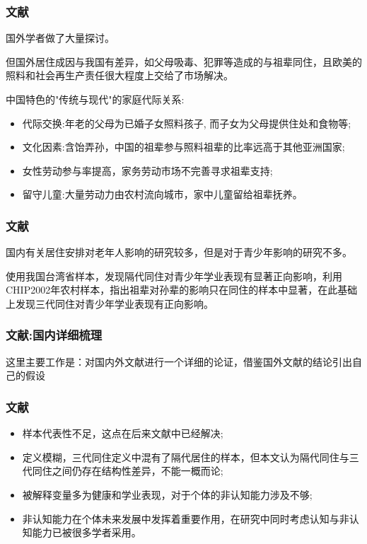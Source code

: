 \documentclass{beamer}
\begin{document}
\begin{frame}
\frametitle{文献} 
国外学者做了大量探讨\citep{hayslip_grandparents_2005,monserud_household_2011,westphal_what_2015,jappens_parental_2016,daniela_del_boca_role_2017,zamberletti_grandparents_2018}。
\par 但国外居住成因与我国有差异，如父母吸毒\citep{NBERw27633}、犯罪等造成的与祖辈同住，且欧美的照料和社会再生产责任很大程度上交给了市场解决。
\par 中国特色的"传统与现代"的家庭代际关系\citep{shi_2016,ji_2019}:
	\begin{itemize}
		\item 代际交换:年老的父母为已婚子女照料孩子, 而子女为父母提供住处和食物等\citep{wang_2008};
		\item 文化因素:\citep{chu_coresidence_2011}含饴弄孙，中国的祖辈参与照料祖辈的比率远高于其他亚洲国家\citep{zhou_2016};
		\item 女性劳动参与率提高\citep{lv_2016}，家务劳动市场不完善寻求祖辈支持;
		\item 留守儿童:大量劳动力由农村流向城市，家中儿童留给祖辈抚养。
	\end{itemize}
\end{frame}
\begin{frame}[allowframebreaks]
\frametitle{文献} 
	国内有关居住安排对老年人影响的研究较多，但是对于青少年影响的研究不多\citep{pong_co-resident_2010,zeng_effects_2014,liang_2017,he_childhood_2018,张帆2020}。
	\par \citet{pong_co-resident_2010}使用我国台湾省样本，发现隔代同住对青少年学业表现有显著正向影响，\citet{zeng_effects_2014}利用CHIP2002年农村样本，指出祖辈对孙辈的影响只在同住的样本中显著，在此基础上\citet{张帆2020}发现三代同住对青少年学业表现有正向影响。
\end{frame}

\begin{frame}
\frametitle{文献:国内详细梳理} 
这里主要工作是：对国内外文献进行一个详细的论证，借鉴国外文献的结论引出自己的假设
\end{frame}


\begin{frame}
\frametitle{文献} 
	\begin{itemize}
			\item 样本代表性不足\citep{pong_co-resident_2010}，这点在后来文献中已经解决;
			\item 定义模糊，\citet{张帆2020}三代同住定义中混有了隔代居住的样本，但本文认为隔代同住与三代同住之间仍存在结构性差异，不能一概而论;
			\item 被解释变量多为健康\citep{liang_2017,he_childhood_2018}和学业表现\citep{张帆2020}，对于个体的非认知能力涉及不够;
			\item 非认知能力在个体未来发展中发挥着重要作用\citep{heckman_effects_2006,kautz_fostering_2014,赖德胜_2020}，在研究中同时考虑认知与非认知能力已被很多学者采用\citep{huang_2017,le_2017}。
	\end{itemize}

\end{frame}
\end{document}
